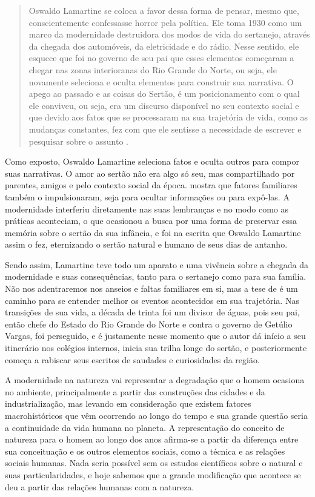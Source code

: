 \begin{refsection}
    \begin{quotation}
        Oswaldo Lamartine se coloca a favor dessa forma de pensar, mesmo que, conscientemente confessasse horror pela política. Ele toma 1930 como um marco da modernidade destruidora dos modos de vida do sertanejo, através da chegada dos automóveis, da eletricidade e do rádio. Nesse sentido, ele esquece que foi no governo de seu pai que esses elementos começaram a chegar nas zonas interioranas do Rio Grande do Norte, ou seja, ele novamente seleciona e oculta elementos para construir sua narrativa. O apego ao passado e as coisas do Sertão, é um posicionamento com o qual ele conviveu, ou seja, era um discurso disponível no seu contexto social e que devido aos fatos que se processaram na sua trajetória de vida, como as mudanças constantes, fez com que ele sentisse a necessidade de escrever e pesquisar sobre o assunto \cite[p.~47--48]{SILVA2019Lugares}. 
    \end{quotation}

    Como exposto, Oswaldo Lamartine seleciona fatos e oculta outros para compor suas narrativas. O amor ao sertão não era algo só seu, mas compartilhado por parentes, amigos e pelo contexto social da época. \textcite{SILVA2019Lugares} mostra que fatores familiares também o impulsionaram, seja para ocultar informações ou para expô-las. A modernidade interferiu diretamente nas suas lembranças e no modo como as práticas aconteciam, o que ocasionou a busca por uma forma de preservar essa memória sobre o sertão da sua infância, e foi na escrita que Oswaldo Lamartine assim o fez, eternizando o sertão natural e humano de seus dias de antanho.  

    Sendo assim, Lamartine teve todo um aparato e uma vivência sobre a chegada da modernidade e suas consequências, tanto para o sertanejo como para sua família. Não nos adentraremos nos anseios e faltas familiares em si, mas a tese de \textcite{CASTRO2015Areia} é um caminho para se entender melhor os eventos acontecidos em sua trajetória. Nas transições de sua vida, a década de trinta foi um divisor de águas, pois seu pai, então chefe do Estado do Rio Grande do Norte e contra o governo de Getúlio Vargas, foi perseguido, e é justamente nesse momento que o autor dá início a seu itinerário nos colégios internos, inicia sua trilha longe do sertão, e posteriormente começa a rabiscar seus escritos de saudades e curiosidades da região.  

    A modernidade na natureza vai representar a degradação que o homem ocasiona no ambiente, principalmente a partir das construções das cidades e da industrialização, mas levando em consideração que existem fatores macrohistóricos que vêm ocorrendo ao longo do tempo e sua grande questão seria a continuidade da vida humana no planeta. A representação do conceito de natureza para o homem ao longo dos anos afirma-se a partir da diferença entre sua conceituação e os outros elementos sociais, como a técnica e as relações sociais humanas. Nada seria possível sem os estudos científicos sobre o natural e suas particularidades, e hoje sabemos que a grande modificação que acontece se deu a partir das relações humanas com a natureza.  


\end{refsection}
